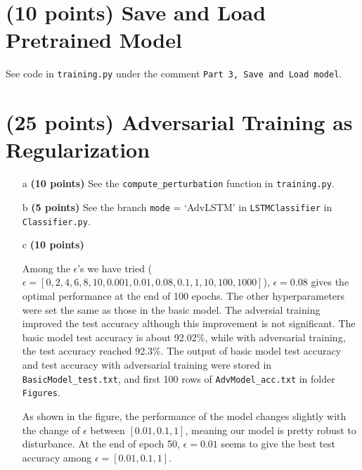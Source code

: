 \documentclass[11pt]{report}
\begin{document}
\section{(10 points)  Save and Load Pretrained Model}

See code in \texttt{training.py} under the comment \texttt{Part 3, Save and Load model}.  

\section{(25 points) Adversarial Training as Regularization}
\begin{itemize}
    \item[a] \textbf{(10 points)} See the \texttt{compute\_perturbation} function in \texttt{training.py}.
    \item[b] \textbf{(5 points)} See the branch \texttt{mode} = `AdvLSTM' in \texttt{LSTMClassifier} in \texttt{Classifier.py}.
    \item[c] \textbf{(10 points)} 

    Among the $\epsilon$'s we have tried ($\epsilon = [0, 2, 4, 6, 8, 10, 0.001, 0.01, 0.08, 0.1, 1, 10, 100, 1000]$), $\epsilon = 0.08$ gives the optimal performance at the end of 100 epochs. 
    The other hyperparameters were set the same as those in the basic model. 
    The adversial training improved the test accuracy although this improvement is not significant. 
    The basic model test accuracy is about 92.02\%, while with adversarial training, the test accuracy reached 92.3\%. 
    The output of basic model test accuracy and test accuracy with adversarial training were stored in \texttt{BasicModel\_test.txt}, and first 100 rows of \texttt{AdvModel\_acc.txt} in folder \texttt{Figures}. 

    As shown in the figure, the performance of the model changes slightly with the change of $\epsilon$ between $[0.01, 0.1, 1]$, meaning our model is pretty robust to disturbance. 
    At the end of epoch 50, $\epsilon = 0.01$ seems to give the best test accuracy among $\epsilon = [0.01, 0.1, 1]$. 


\end{itemize}
\end{document}
